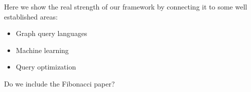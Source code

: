 Here we show the real strength of our framework by connecting it to some well established areas:

\begin{itemize}
\item Graph query languages
\item Machine learning
\item Query optimization
\end{itemize}

Do we include the Fibonacci paper?